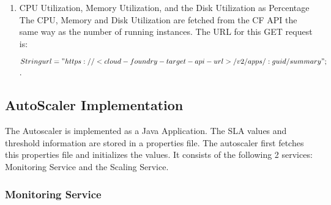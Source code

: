 \documentclass[article,type=msc,colorback,12pt,accentcolor=tud7b]{tudthesis}
\begin{document}
\begin{enumerate}
\begin{lstlisting}
con.setRequestMethod("GET");
con.setRequestProperty("Content-Type", "application/json");
con.setRequestProperty("Accept", "application/json");
con.setRequestProperty("Authorization", oAuthToken);		

int responseCode = con.getResponseCode();
System.out.println("\nSending 'GET' request to URL : " + url);
System.out.println("Response Code : " + responseCode);

if(responseCode == 200){
	BufferedReader in = new BufferedReader(
	new InputStreamReader(con.getInputStream()));
	String inputLine;
	StringBuffer response = new StringBuffer();
	
	while ((inputLine = in.readLine()) != null) {
		response.append(inputLine);
	}
	in.close();
	
	String respose_str = response.toString();
	double avg_cpu_all_instances = ParseCFJsonResponses.parseJsonGetCPUAvg(respose_str);
	MonitoringService.cpu.add(avg_cpu_all_instances);
}	
\end{lstlisting}
	
	The authorization token to access the API is fetched by making calling the cf call: $cf oauth-token$. The URL is the CF API end point and the :guid in the URL is the GUID of the application which is retrieved from the Environment variables of the application. The environmnetal variables is accessed by the CF call: $cf env app-name$
	
	\item{CPU Utilization, Memory Utilization, and the Disk Utilization as Percentage} 
	 The CPU, Memory and Disk Utilization are fetched from the CF API the same way as the number of running instances. The URL for this GET request is: 
	 
	$String url = "https://<cloud-foundry-target-api-url>/v2/apps/:guid/summary"; $. 
	
\end{enumerate}	
	
	\subsection{AutoScaler Implementation} 
	
	The Autoscaler is implemented as a Java Application. The SLA values and threshold information are stored in a properties file. The autoscaler first fetches this properties file and initializes the values. It consists of the following 2 services: Monitoring Service and the Scaling Service. 
	
\subsubsection{Monitoring Service}
	
\end{document}
